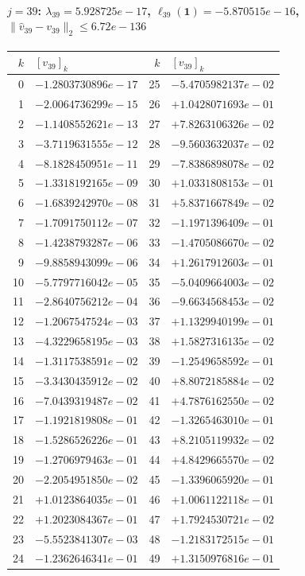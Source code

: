 \documentclass[11pt]{article}
\begin{document}
\paragraph{$j = 39$: $\lambda_{39} = 5.928725e-17$, \quad $\ell_{39}(\mathbf{1}) = -5.870515e-16$, \quad $\|\hat{v}_{39} - v_{39}\|_2 \leq 6.72e-136$}
\begin{center}
{\footnotesize
\begin{tabular}{r@{\;\;}l@{\quad}r@{\;\;}l}
\toprule
$k$ & $[v_{39}]_k$ & $k$ & $[v_{39}]_k$ \\
\midrule
0 & $-1.2803730896e-17$ & 25 & $-5.4705982137e-02$ \\
1 & $-2.0064736299e-15$ & 26 & $+1.0428071693e-01$ \\
2 & $-1.1408552621e-13$ & 27 & $+7.8263106326e-02$ \\
3 & $-3.7119631555e-12$ & 28 & $-9.5603632037e-02$ \\
4 & $-8.1828450951e-11$ & 29 & $-7.8386898078e-02$ \\
5 & $-1.3318192165e-09$ & 30 & $+1.0331808153e-01$ \\
6 & $-1.6839242970e-08$ & 31 & $+5.8371667849e-02$ \\
7 & $-1.7091750112e-07$ & 32 & $-1.1971396409e-01$ \\
8 & $-1.4238793287e-06$ & 33 & $-1.4705086670e-02$ \\
9 & $-9.8858943099e-06$ & 34 & $+1.2617912603e-01$ \\
10 & $-5.7797716042e-05$ & 35 & $-5.0409664003e-02$ \\
11 & $-2.8640756212e-04$ & 36 & $-9.6634568453e-02$ \\
12 & $-1.2067547524e-03$ & 37 & $+1.1329940199e-01$ \\
13 & $-4.3229658195e-03$ & 38 & $+1.5827316135e-02$ \\
14 & $-1.3117538591e-02$ & 39 & $-1.2549658592e-01$ \\
15 & $-3.3430435912e-02$ & 40 & $+8.8072185884e-02$ \\
16 & $-7.0439319487e-02$ & 41 & $+4.7876162550e-02$ \\
17 & $-1.1921819808e-01$ & 42 & $-1.3265463010e-01$ \\
18 & $-1.5286526226e-01$ & 43 & $+8.2105119932e-02$ \\
19 & $-1.2706979463e-01$ & 44 & $+4.8429665570e-02$ \\
20 & $-2.2054951850e-02$ & 45 & $-1.3396065920e-01$ \\
21 & $+1.0123864035e-01$ & 46 & $+1.0061122118e-01$ \\
22 & $+1.2023084367e-01$ & 47 & $+1.7924530721e-02$ \\
23 & $-5.5523841307e-03$ & 48 & $-1.2183172515e-01$ \\
24 & $-1.2362646341e-01$ & 49 & $+1.3150976816e-01$ \\
\bottomrule
\end{tabular}
}
\end{center}
\end{document}
